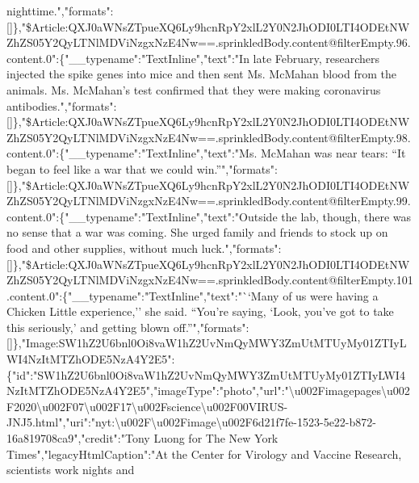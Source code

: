 nighttime.","formats":{[}{]}\},"\$Article:QXJ0aWNsZTpueXQ6Ly9hcnRpY2xlL2Y0N2JhODI0LTI4ODEtNWZhZS05Y2QyLTNlMDViNzgxNzE4Nw==.sprinkledBody.content@filterEmpty.96.content.0":\{"\_\_typename":"TextInline","text":"In
late February, researchers injected the spike genes into mice and then
sent Ms. McMahan blood from the animals. Ms. McMahan's test confirmed
that they were making coronavirus
antibodies.","formats":{[}{]}\},"\$Article:QXJ0aWNsZTpueXQ6Ly9hcnRpY2xlL2Y0N2JhODI0LTI4ODEtNWZhZS05Y2QyLTNlMDViNzgxNzE4Nw==.sprinkledBody.content@filterEmpty.98.content.0":\{"\_\_typename":"TextInline","text":"Ms.
McMahan was near tears: ``It began to feel like a war that we could
win.''","formats":{[}{]}\},"\$Article:QXJ0aWNsZTpueXQ6Ly9hcnRpY2xlL2Y0N2JhODI0LTI4ODEtNWZhZS05Y2QyLTNlMDViNzgxNzE4Nw==.sprinkledBody.content@filterEmpty.99.content.0":\{"\_\_typename":"TextInline","text":"Outside
the lab, though, there was no sense that a war was coming. She urged
family and friends to stock up on food and other supplies, without much
luck.","formats":{[}{]}\},"\$Article:QXJ0aWNsZTpueXQ6Ly9hcnRpY2xlL2Y0N2JhODI0LTI4ODEtNWZhZS05Y2QyLTNlMDViNzgxNzE4Nw==.sprinkledBody.content@filterEmpty.101.content.0":\{"\_\_typename":"TextInline","text":"``Many
of us were having a Chicken Little experience,'' she said. ``You're
saying, `Look, you've got to take this seriously,' and getting blown
off.''","formats":{[}{]}\},"Image:SW1hZ2U6bnl0Oi8vaW1hZ2UvNmQyMWY3ZmUtMTUyMy01ZTIyLWI4NzItMTZhODE5NzA4Y2E5":\{"id":"SW1hZ2U6bnl0Oi8vaW1hZ2UvNmQyMWY3ZmUtMTUyMy01ZTIyLWI4NzItMTZhODE5NzA4Y2E5","imageType":"photo","url":"\textbackslash{}u002Fimagepages\textbackslash{}u002F2020\textbackslash{}u002F07\textbackslash{}u002F17\textbackslash{}u002Fscience\textbackslash{}u002F00VIRUS-JNJ5.html","uri":"nyt:\textbackslash{}u002F\textbackslash{}u002Fimage\textbackslash{}u002F6d21f7fe-1523-5e22-b872-16a819708ca9","credit":"Tony
Luong for The New York Times","legacyHtmlCaption":"At the Center for
Virology and Vaccine Research, scientists work nights and
